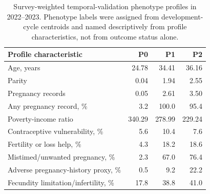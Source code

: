 \begin{table}[tbp]
\centering
\caption{Survey-weighted temporal-validation phenotype profiles in 2022--2023. Phenotype labels were assigned from development-cycle centroids and named descriptively from profile characteristics, not from outcome status alone.}
\label{tab:phenotype_profiles}
\small
\setlength{\tabcolsep}{6pt}
\begin{tabular*}{\textwidth}{@{\extracolsep{\fill}}>{\raggedright\arraybackslash}p{}rrr@{}}
\toprule
Profile characteristic & P0 & P1 & P2 \\
\midrule
Age, years & 24.78 & 34.41 & 36.16 \\
Parity & 0.04 & 1.94 & 2.55 \\
Pregnancy records & 0.05 & 2.61 & 3.50 \\
Any pregnancy record, \% & 3.2 & 100.0 & 95.4 \\
Poverty-income ratio & 340.29 & 278.99 & 229.24 \\
Contraceptive vulnerability, \% & 5.6 & 10.4 & 7.6 \\
Fertility or loss help, \% & 4.3 & 18.2 & 18.6 \\
Mistimed/unwanted pregnancy, \% & 2.3 & 67.0 & 76.4 \\
Adverse pregnancy-history proxy, \% & 0.5 & 9.2 & 22.2 \\
Fecundity limitation/infertility, \% & 17.8 & 38.8 & 41.0 \\
\bottomrule
\end{tabular*}
\end{table}
